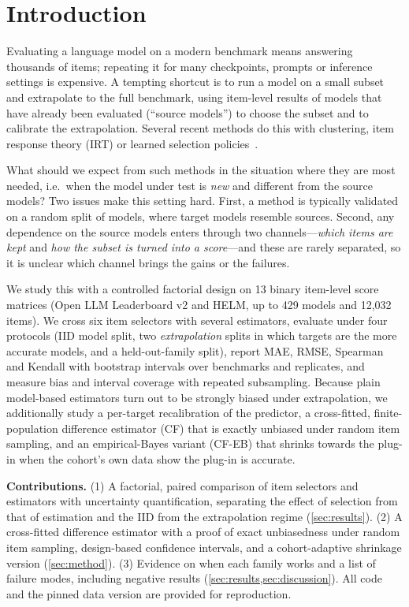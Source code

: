 \section{Introduction}
\label{sec:intro}
Evaluating a language model on a modern benchmark means answering thousands of items; repeating it for many checkpoints, prompts or inference settings is expensive. A tempting shortcut is to run a model on a small subset and extrapolate to the full benchmark, using item-level results of models that have already been evaluated (``source models'') to choose the subset and to calibrate the extrapolation. Several recent methods do this with clustering, item response theory (IRT) or learned selection policies~\citep{vivek2024anchor,maiapolo2024tiny,kipnis2025metabench,li2025active,pacchiardi2024100}.

What should we expect from such methods in the situation where they are most needed, i.e.\ when the model under test is \emph{new} and different from the source models? Two issues make this setting hard. First, a method is typically validated on a random split of models, where target models resemble sources. Second, any dependence on the source models enters through two channels---\emph{which items are kept} and \emph{how the subset is turned into a score}---and these are rarely separated, so it is unclear which channel brings the gains or the failures.

We study this with a controlled factorial design on 13 binary item-level score matrices (Open LLM Leaderboard v2 and HELM, up to 429 models and 12{,}032 items). We cross six item selectors with several estimators, evaluate under four protocols (IID model split, two \emph{extrapolation} splits in which targets are the more accurate models, and a held-out-family split), report MAE, RMSE, Spearman and Kendall with bootstrap intervals over benchmarks and replicates, and measure bias and interval coverage with repeated subsampling.
Because plain model-based estimators turn out to be strongly biased under extrapolation, we additionally study a per-target recalibration of the predictor, a cross-fitted, finite-population difference estimator (CF) that is exactly unbiased under random item sampling, and an empirical-Bayes variant (CF-EB) that shrinks towards the plug-in when the cohort's own data show the plug-in is accurate.

\textbf{Contributions.} (1) A factorial, paired comparison of item selectors and estimators with uncertainty quantification, separating the effect of selection from that of estimation and the IID from the extrapolation regime (\cref{sec:results}). (2) A cross-fitted difference estimator with a proof of exact unbiasedness under random item sampling, design-based confidence intervals, and a cohort-adaptive shrinkage version (\cref{sec:method}). (3) Evidence on when each family works and a list of failure modes, including negative results (\cref{sec:results,sec:discussion}). All code and the pinned data version are provided for reproduction.
